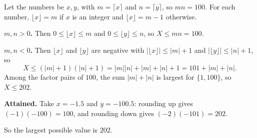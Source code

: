 Let the numbers be $x,y$, with $m=\lceil x\rceil$ and $n=\lceil y\rceil$, so $mn=100$. For each number, $\lfloor x\rfloor=m$ if $x$ is an integer and $\lfloor x\rfloor=m-1$ otherwise.

\textbf{$m,n>0$.} Then $0\le\lfloor x\rfloor\le m$ and $0\le\lfloor y\rfloor\le n$, so $X\le mn=100$.

\textbf{$m,n<0$.} Then $\lfloor x\rfloor$ and $\lfloor y\rfloor$ are negative with $|\lfloor x\rfloor|\le|m|+1$ and $|\lfloor y\rfloor|\le|n|+1$, so
\[
X\le(|m|+1)(|n|+1)=|m||n|+|m|+|n|+1=101+|m|+|n| .
\]
Among the factor pairs of $100$, the sum $|m|+|n|$ is largest for $\{1,100\}$, so $X\le202$.

\textbf{Attained.} Take $x=-1.5$ and $y=-100.5$: rounding up gives $(-1)(-100)=100$, and rounding down gives $(-2)(-101)=202$.

So the largest possible value is $\boxed{202}$.
